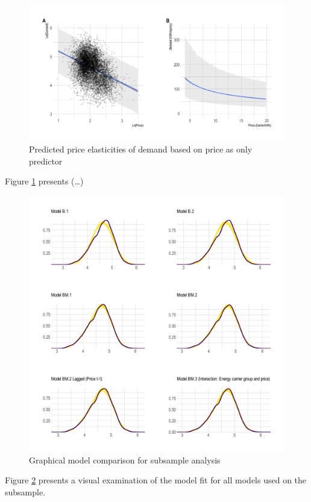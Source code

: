 \documentclass[12pt,twoside]{reedthesis}
\begin{document}
\newpage
\begin{figure}

{\centering \includegraphics[width=1\linewidth]{figure/plot_b1} 

}

\caption{Predicted price elasticities of demand based on price as only predictor}\label{fig:elasticity-predictions-b1}
\end{figure}
\noindent
Figure \ref{fig:elasticity-predictions-b1} presents (\ldots)

\newpage
\begin{figure}

{\centering \includegraphics[width=1\linewidth]{figure/plot-model-comparison} 

}

\caption{Graphical model comparison for subsample analysis}\label{fig:plot-model-comparison}
\end{figure}
\noindent
Figure \ref{fig:plot-model-comparison} presents a visual examination of the model fit for all models used on the subsample.
\end{document}
